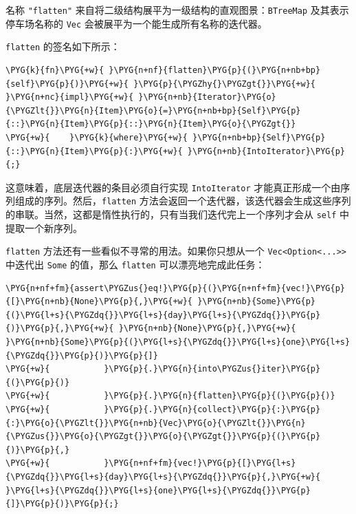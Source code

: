 名称 \texttt{"flatten"} 来自将二级结构展平为一级结构的直观图景：\texttt{BTreeMap} 及其表示停车场名称的 \texttt{Vec} 会被展平为一个能生成所有名称的迭代器。

\texttt{flatten} 的签名如下所示：

\begin{Verbatim}[commandchars=\\\{\},breaklines=true,breakanywhere=true,fontsize=\codefont,xleftmargin=17bp]
\PYG{k}{fn}\PYG{+w}{ }\PYG{n+nf}{flatten}\PYG{p}{(}\PYG{n+nb+bp}{self}\PYG{p}{)}\PYG{+w}{ }\PYG{p}{\PYGZhy{}\PYGZgt{}}\PYG{+w}{ }\PYG{n+nc}{impl}\PYG{+w}{ }\PYG{n+nb}{Iterator}\PYG{o}{\PYGZlt{}}\PYG{n}{Item}\PYG{o}{=}\PYG{n+nb+bp}{Self}\PYG{p}{::}\PYG{n}{Item}\PYG{p}{::}\PYG{n}{Item}\PYG{o}{\PYGZgt{}}
\PYG{+w}{    }\PYG{k}{where}\PYG{+w}{ }\PYG{n+nb+bp}{Self}\PYG{p}{::}\PYG{n}{Item}\PYG{p}{:}\PYG{+w}{ }\PYG{n+nb}{IntoIterator}\PYG{p}{;}
\end{Verbatim}

这意味着，底层迭代器的条目必须自行实现 \texttt{IntoIterator} 才能真正形成一个由序列组成的序列。然后，\texttt{flatten} 方法会返回一个迭代器，该迭代器会生成这些序列的串联。当然，这都是惰性执行的，只有当我们迭代完上一个序列才会从 \texttt{self} 中提取一个新序列。

\texttt{flatten} 方法还有一些看似不寻常的用法。如果你只想从一个 \texttt{Vec<Option<...>>} 中迭代出 \texttt{Some} 的值，那么 \texttt{flatten} 可以漂亮地完成此任务：

\begin{Verbatim}[commandchars=\\\{\},breaklines=true,breakanywhere=true,fontsize=\codefont,xleftmargin=17bp]
\PYG{n+nf+fm}{assert\PYGZus{}eq!}\PYG{p}{(}\PYG{n+nf+fm}{vec!}\PYG{p}{[}\PYG{n+nb}{None}\PYG{p}{,}\PYG{+w}{ }\PYG{n+nb}{Some}\PYG{p}{(}\PYG{l+s}{\PYGZdq{}}\PYG{l+s}{day}\PYG{l+s}{\PYGZdq{}}\PYG{p}{)}\PYG{p}{,}\PYG{+w}{ }\PYG{n+nb}{None}\PYG{p}{,}\PYG{+w}{ }\PYG{n+nb}{Some}\PYG{p}{(}\PYG{l+s}{\PYGZdq{}}\PYG{l+s}{one}\PYG{l+s}{\PYGZdq{}}\PYG{p}{)}\PYG{p}{]}
\PYG{+w}{           }\PYG{p}{.}\PYG{n}{into\PYGZus{}iter}\PYG{p}{(}\PYG{p}{)}
\PYG{+w}{           }\PYG{p}{.}\PYG{n}{flatten}\PYG{p}{(}\PYG{p}{)}
\PYG{+w}{           }\PYG{p}{.}\PYG{n}{collect}\PYG{p}{:}\PYG{p}{:}\PYG{o}{\PYGZlt{}}\PYG{n+nb}{Vec}\PYG{o}{\PYGZlt{}}\PYG{n}{\PYGZus{}}\PYG{o}{\PYGZgt{}}\PYG{o}{\PYGZgt{}}\PYG{p}{(}\PYG{p}{)}\PYG{p}{,}
\PYG{+w}{           }\PYG{n+nf+fm}{vec!}\PYG{p}{[}\PYG{l+s}{\PYGZdq{}}\PYG{l+s}{day}\PYG{l+s}{\PYGZdq{}}\PYG{p}{,}\PYG{+w}{ }\PYG{l+s}{\PYGZdq{}}\PYG{l+s}{one}\PYG{l+s}{\PYGZdq{}}\PYG{p}{]}\PYG{p}{)}\PYG{p}{;}
\end{Verbatim}

